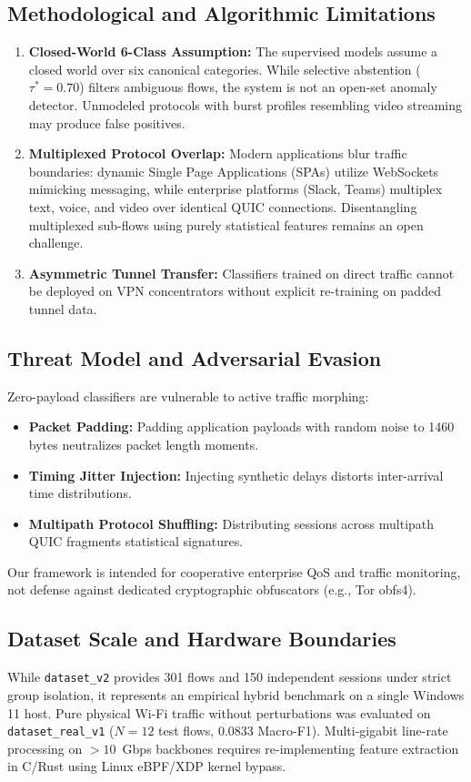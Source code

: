 \documentclass[conference]{IEEEtran}
\begin{document}
\subsection{Methodological and Algorithmic Limitations}
\begin{enumerate}
    \item \textbf{Closed-World 6-Class Assumption:} The supervised models assume a closed world over six canonical categories. While selective abstention ($\tau^* = 0.70$) filters ambiguous flows, the system is not an open-set anomaly detector. Unmodeled protocols with burst profiles resembling video streaming may produce false positives.
    \item \textbf{Multiplexed Protocol Overlap:} Modern applications blur traffic boundaries: dynamic Single Page Applications (SPAs) utilize WebSockets mimicking messaging, while enterprise platforms (Slack, Teams) multiplex text, voice, and video over identical QUIC connections. Disentangling multiplexed sub-flows using purely statistical features remains an open challenge.
    \item \textbf{Asymmetric Tunnel Transfer:} Classifiers trained on direct traffic cannot be deployed on VPN concentrators without explicit re-training on padded tunnel data.
\end{enumerate}

\subsection{Threat Model and Adversarial Evasion}
Zero-payload classifiers are vulnerable to active traffic morphing:
\begin{itemize}
    \item \textbf{Packet Padding:} Padding application payloads with random noise to 1460 bytes neutralizes packet length moments.
    \item \textbf{Timing Jitter Injection:} Injecting synthetic delays distorts inter-arrival time distributions.
    \item \textbf{Multipath Protocol Shuffling:} Distributing sessions across multipath QUIC fragments statistical signatures.
\end{itemize}
Our framework is intended for cooperative enterprise QoS and traffic monitoring, not defense against dedicated cryptographic obfuscators (e.g., Tor obfs4).

\subsection{Dataset Scale and Hardware Boundaries}
While \texttt{dataset\_v2} provides 301 flows and 150 independent sessions under strict group isolation, it represents an empirical hybrid benchmark on a single Windows 11 host. Pure physical Wi-Fi traffic without perturbations was evaluated on \texttt{dataset\_real\_v1} ($N=12$ test flows, 0.0833 Macro-F1). Multi-gigabit line-rate processing on $>10$~Gbps backbones requires re-implementing feature extraction in C/Rust using Linux eBPF/XDP kernel bypass.
\end{document}

